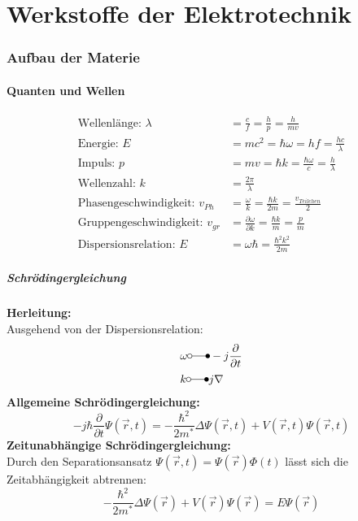 \documentclass[a4paper,twocolumn,10pt]{article}
\begin{document}
{\small \tableofcontents}
\newpage

\part{Werkstoffe der Elektrotechnik}

\section{Aufbau der Materie}

\subsection{Quanten und Wellen}
\begin{equation*}
\begin{split}
\text{Wellenlänge: }\lambda&=\frac{c}{f}=\frac{h}{p}=\frac{h}{mv} \\
\text{Energie: }E&=mc^2=\hbar\omega=hf=\frac{hc}{\lambda} \\
\text{Impuls: }p&=mv=\hbar k=\frac{\hbar \omega}{c}=\frac{h}{\lambda} \\
\text{Wellenzahl: }k&=\frac{2\pi}{\lambda} \\
\text{Phasengeschwindigkeit: }v_{Ph}&=\frac{\omega}{k}=\frac{\hbar k}{2m}=\frac{v_{Teilchen}}{2}\\
\text{Gruppengeschwindigkeit: }v_{gr}&=\frac{\partial\omega}{\partial k}=\frac{\hbar k}{m}=\frac{p}{m}\\
\text{Dispersionsrelation: }E&=\omega\hbar =\frac{\hbar^2k^2}{2m}
\end{split}
\end{equation*}

\subsubsection{Schrödingergleichung}
\textbf{Herleitung:}\\
Ausgehend von der Dispersionsrelation:
\begin{equation*}
\begin{split}
&\omega\laplace -j\frac{\partial}{\partial t}\\
&k\laplace j\nabla
\end{split}
\end{equation*}
\textbf{Allgemeine Schrödingergleichung:}
\begin{equation*}
-j\hbar\frac{\partial}{\partial t}\Psi (\overrightarrow{r},t)=-\frac{\hbar^2}{2m^*}\Delta\Psi(\overrightarrow{r},t)+V(\overrightarrow{r},t)\Psi(\overrightarrow{r},t)
\end{equation*}
\textbf{Zeitunabhängige Schrödingergleichung:}\\
Durch den Separationsansatz $\Psi(\overrightarrow{r},t)=\Psi(\overrightarrow{r})\Phi(t)$ lässt sich die Zeitabhängigkeit abtrennen:
\begin{equation*}
-\frac{\hbar^2}{2m^*}\Delta\Psi(\overrightarrow{r})+V(\overrightarrow{r})\Psi(\overrightarrow{r})=E\Psi(\overrightarrow{r})
\end{equation*}
\end{document}
